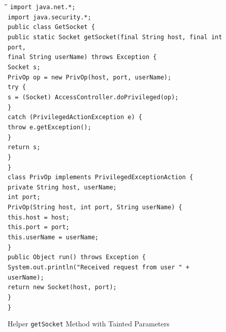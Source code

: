 \begin{figure}
	\begin{tabbing}
		\hspace*{0.25in}\=\hspace*{0.25in}\=\hspace*{0.25in}\=\hspace*{0.25in}\=\hspace*{0.25in}\=\hspace*{0.25in}\kill
		\texttt{import java.net.*;}\\
		\texttt{import java.security.*;}\\
		\verb"public class GetSocket {"\\
			\>\verb"public static Socket getSocket(final String host, final int port,"\\
			\>\>\>\verb"final String userName) throws Exception {"\\
				\>\>\texttt{Socket s;}\\
				\>\>\texttt{PrivOp op = new PrivOp(host, port, userName);}\\
				\>\>\verb"try {"\\
					\>\>\>\texttt{s = (Socket) AccessController.doPrivileged(op);}\\
					\>\>\verb"}"\\
				\>\>\verb"catch (PrivilegedActionException e) {"\\
					\>\>\>\verb"throw e.getException();"\\
					\>\>\verb"}"\\
				\>\>\texttt{return s;}\\
				\>\verb"}"\\
			\verb"}"\\
		\verb"class PrivOp implements PrivilegedExceptionAction {"\\
			\>\texttt{private String host, userName;}\\
			\>\texttt{int port;}\\
			\>\verb"PrivOp(String host, int port, String userName) {"\\
				\>\>\verb"this.host = host;"\\
				\>\>\verb"this.port = port;"\\
				\>\>\verb"this.userName = userName;"\\
				\>\verb"}"\\
			\>\verb"public Object run() throws Exception {"\\
				\>\>\texttt{System.out.println("Received request from user " + userName);}\\
				\>\>\verb"return new Socket(host, port);"\\
				\>\verb"}"\\
			\verb"}"
	\end{tabbing}
	\caption{Helper \texttt{getSocket} Method with Tainted Parameters}
	\label{fig:helperMethod}
\end{figure}

